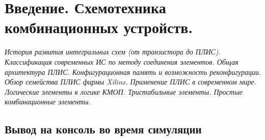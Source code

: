 \chapter{Введение. Схемотехника комбинационных устройств.}


\emph{История развития интегральных схем (от транзистора до ПЛИС). Классификация современных ИС по методу соединения элементов. Общая архитектура ПЛИС. Конфигурационная память и возможность реконфигурации. Обзор семейства ПЛИС фирмы Xilinx. Применение ПЛИС в современном мире. Логические элементы в логике КМОП. Тристабильные элементы. Простые комбинационные элементы.}

\section{Вывод на консоль во время симуляции}
